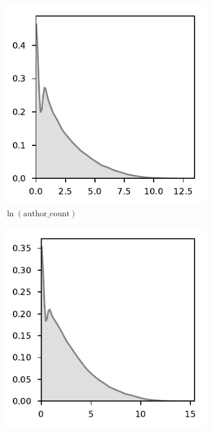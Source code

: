 \documentclass{article}
\begin{document}

\begin{figure}
     \centering
     \begin{subfigure}[b]{0.49\textwidth}
         \centering
         \includegraphics[width=\textwidth]{kde-author_count-log.pdf}
         \caption{$\ln(\text{author\_count})$}
         \label{hist:author}
     \end{subfigure}
     \hfill
     \begin{subfigure}[b]{0.49\textwidth}
         \centering
         \includegraphics[width=\textwidth]{kde-comment_count-log.pdf}

\end{subfigure}
\end{figure}
\end{document}
